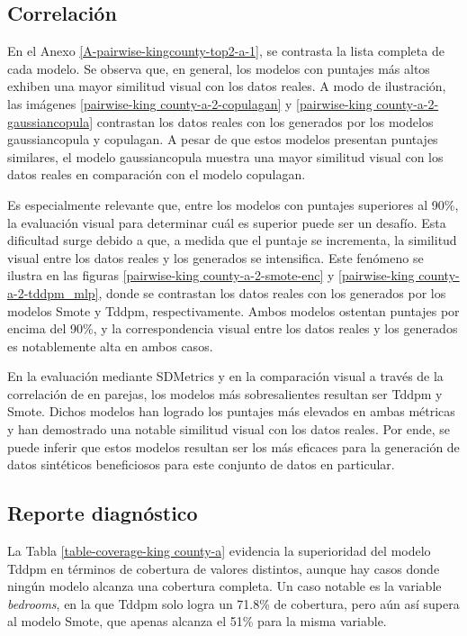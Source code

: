 \newpage

\subsection{Correlación}
En el Anexo \ref{A-pairwise-kingcounty-top2-a-1}, se contrasta la lista completa de cada modelo. Se observa que, en general, los modelos con puntajes más altos exhiben una mayor similitud visual con los datos reales. A modo de ilustración, las imágenes \ref{pairwise-king county-a-2-copulagan} y \ref{pairwise-king county-a-2-gaussiancopula} contrastan los datos reales con los generados por los modelos gaussiancopula y copulagan. A pesar de que estos modelos presentan puntajes similares, el modelo gaussiancopula muestra una mayor similitud visual con los datos reales en comparación con el modelo copulagan.



\newpage
Es especialmente relevante que, entre los modelos con puntajes superiores al 90\%, la evaluación visual para determinar cuál es superior puede ser un desafío. Esta dificultad surge debido a que, a medida que el puntaje se incrementa, la similitud visual entre los datos reales y los generados se intensifica. Este fenómeno se ilustra en las figuras \ref{pairwise-king county-a-2-smote-enc} y \ref{pairwise-king county-a-2-tddpm_mlp}, donde se contrastan los datos reales con los generados por los modelos Smote y Tddpm, respectivamente. Ambos modelos ostentan puntajes por encima del 90\%, y la correspondencia visual entre los datos reales y los generados es notablemente alta en ambos casos.




\newpage
En la evaluación mediante SDMetrics y en la comparación visual a través de la correlación de en parejas, los modelos más sobresalientes resultan ser Tddpm y Smote. Dichos modelos han logrado los puntajes más elevados en ambas métricas y han demostrado una notable similitud visual con los datos reales. Por ende, se puede inferir que estos modelos resultan ser los más eficaces para la generación de datos sintéticos beneficiosos para este conjunto de datos en particular.

\subsection{Reporte diagnóstico}
La Tabla \ref{table-coverage-king county-a} evidencia la superioridad del modelo Tddpm en términos de cobertura de valores distintos, aunque hay casos donde ningún modelo alcanza una cobertura completa. Un caso notable es la variable \emph{bedrooms}, en la que Tddpm solo logra un 71.8\% de cobertura, pero aún así supera al modelo Smote, que apenas alcanza el 51\% para la misma variable.

